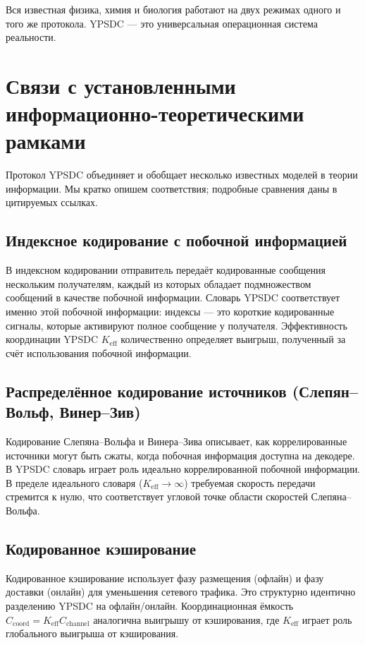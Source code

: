 \documentclass[12pt,a4paper]{article}
\theoremstyle{remark}
\begin{document}
	Вся известная физика, химия и биология работают на двух режимах одного и того же протокола. YPSDC — это универсальная операционная система реальности.
	
	\section{Связи с установленными информационно-теоретическими рамками}
	\label{sec:classical-connections}
	
	Протокол YPSDC объединяет и обобщает несколько известных моделей в теории информации. Мы кратко опишем соответствия; подробные сравнения даны в цитируемых ссылках.
	
	\subsection*{Индексное кодирование с побочной информацией}
	В индексном кодировании \cite{Birk1998,BarYossef2011} отправитель передаёт кодированные сообщения нескольким получателям, каждый из которых обладает подмножеством сообщений в качестве побочной информации. Словарь YPSDC соответствует именно этой побочной информации: индексы — это короткие кодированные сигналы, которые активируют полное сообщение у получателя. Эффективность координации YPSDC \(K_{\mathrm{eff}}\) количественно определяет выигрыш, полученный за счёт использования побочной информации.
	
	\subsection*{Распределённое кодирование источников (Слепян–Вольф, Винер–Зив)}
	Кодирование Слепяна–Вольфа \cite{SlepianWolf1973} и Винера–Зива \cite{WynerZiv1976} описывает, как коррелированные источники могут быть сжаты, когда побочная информация доступна на декодере. В YPSDC словарь играет роль идеально коррелированной побочной информации. В пределе идеального словаря (\(K_{\mathrm{eff}} \to \infty\)) требуемая скорость передачи стремится к нулю, что соответствует угловой точке области скоростей Слепяна–Вольфа.
	
	\subsection*{Кодированное кэширование}
	Кодированное кэширование \cite{MaddahAli2014} использует фазу размещения (офлайн) и фазу доставки (онлайн) для уменьшения сетевого трафика. Это структурно идентично разделению YPSDC на офлайн/онлайн. Координационная ёмкость \(C_{\mathrm{coord}} = K_{\mathrm{eff}} C_{\mathrm{channel}}\) аналогична выигрышу от кэширования, где \(K_{\mathrm{eff}}\) играет роль глобального выигрыша от кэширования.
	
\end{document}
